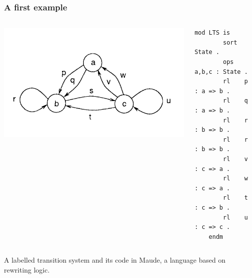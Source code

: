 \documentclass{beamer}
\begin{document}
\begin{frame}[fragile]
    \frametitle{A first example}

    \begin{columns}
        \begin{column}{.5\textwidth}
            \includegraphics[width=\textwidth,height=\textheight,keepaspectratio]{img/lts.png}
        \end{column}

        \begin{column}{.5\textwidth}
            \begin{lstlisting}[language=maude]
    mod LTS is 
        sort State .
        ops a,b,c : State .
        rl    p : a => b .
        rl    q : a => b .
        rl    r : b => b .
        rl    r : b => b .
        rl    v : c => a .
        rl    w : c => a .
        rl    t : c => b .
        rl    u : c => c .
    endm
            \end{lstlisting}
        \end{column}
    \end{columns}

A labelled transition system and its code in Maude, a language based on rewriting logic.
\end{frame}
\end{document}
